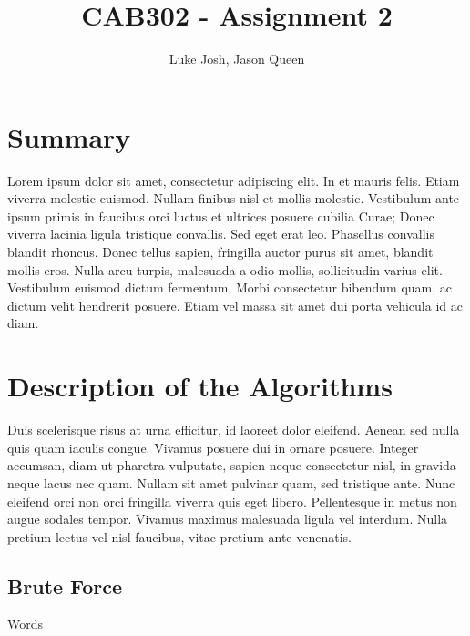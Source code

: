 \documentclass{article}
\title{CAB302 - Assignment 2}
\author{Luke Josh, Jason Queen}
\begin{document}

\maketitle
\tableofcontents

\section{Summary}
    Lorem ipsum dolor sit amet, consectetur adipiscing elit. In et mauris felis. Etiam viverra molestie euismod. Nullam finibus nisl et mollis molestie. Vestibulum ante ipsum primis in faucibus orci luctus et ultrices posuere cubilia Curae; Donec viverra lacinia ligula tristique convallis. Sed eget erat leo. Phasellus convallis blandit rhoncus. Donec tellus sapien, fringilla auctor purus sit amet, blandit mollis eros. Nulla arcu turpis, malesuada a odio mollis, sollicitudin varius elit. Vestibulum euismod dictum fermentum. Morbi consectetur bibendum quam, ac dictum velit hendrerit posuere. Etiam vel massa sit amet dui porta vehicula id ac diam.

\section{Description of the Algorithms}
    Duis scelerisque risus at urna efficitur, id laoreet dolor eleifend. Aenean sed nulla quis quam iaculis congue. Vivamus posuere dui in ornare posuere. Integer accumsan, diam ut pharetra vulputate, sapien neque consectetur nisl, in gravida neque lacus nec quam. Nullam sit amet pulvinar quam, sed tristique ante. Nunc eleifend orci non orci fringilla viverra quis eget libero. Pellentesque in metus non augue sodales tempor. Vivamus maximus malesuada ligula vel interdum. Nulla pretium lectus vel nisl faucibus, vitae pretium ante venenatis.
    \subsection{Brute Force}
        Words
\end{document}
